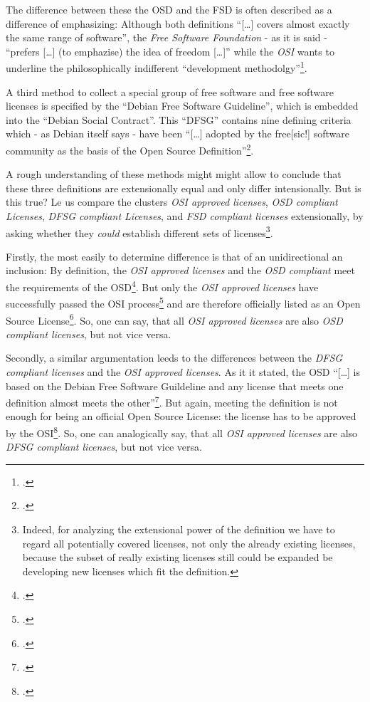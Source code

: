 The difference between these the OSD and the FSD is often described as a
difference of emphasizing: Although both definitions \enquote{[\ldots] covers
almost exactly the same range of software}, the \emph{Free Software Foundation}
- as it is said - \enquote{prefers [\ldots] (to emphazise) the idea of freedom
[\ldots]} while the \emph{OSI} wants to underline the philosophically
indifferent \enquote{development methodolgy}\footcite[pars pro toto:
cf.][232]{Fogel2006a}.

A third method to collect a special group of free software and free software
licenses is specified by the \enquote{Debian Free Software Guideline}, which is
embedded into the \enquote{Debian Social Contract}. This \enquote{DFSG} contains
nine defining criteria which - as Debian itself says - have been
\enquote{[\ldots] adopted by the free[sic!] software community as the basis of
the Open Source Definition}\footcite[cf.][wp]{DFSG2013a}.

A rough understanding of these methods might might allow to conclude that these
three definitions are extensionally equal and only differ intensionally.
But is this true? Le us compare the clusters \emph{OSI approved licenses},
\emph{OSD compliant Licenses}, \emph{DFSG compliant Licenses}, and \emph{FSD
compliant licenses} extensionally, by asking whether they \emph{could} establish
different sets of licenses\footnote{Indeed, for analyzing the extensional power
of the definition we have to regard all potentially covered licenses, not only
the already existing licenses, because the subset of really existing licenses
still could be expanded be developing new licenses which fit the definition.}.

Firstly, the most easily to determine difference is that of an unidirectional an
inclusion: By definition, the \emph{OSI approved licenses} and the \emph{OSD
compliant } meet the requirements of the OSD\footcite[cf.][\nopage
wp]{OSI2012a}. But only the \emph{OSI approved licenses} have successfully
passed the OSI process\footcite[cf.][wp]{OSI2012a} and are therefore officially
listed as an Open Source License\footcite[cf.][\nopage wp]{OSI2012b}. So, one
can say, that all \emph{OSI approved licenses} are also \emph{OSD compliant
licenses}, but not vice versa.

Secondly, a similar argumentation leeds to the differences between the
\emph{DFSG compliant licenses} and the \emph{OSI approved licenses}. As it it
stated, the OSD \enquote{[\ldots] is based on the Debian Free Software
Guildeline and any license that meets one definition almost meets the
other}\footcite[cf.][233]{Fogel2006a}. But again, meeting the definition is not
enough for being an official Open Source License: the license has to be approved
by the OSI\footcite[cf.][\nopage wp]{OSI2012b}. So, one can analogically say,
that all \emph{OSI approved licenses} are also \emph{DFSG compliant licenses},
but not vice versa.

